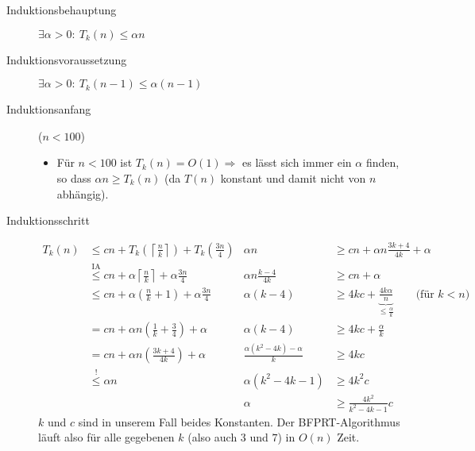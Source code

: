 \documentclass[a4paper,10pt]{scrartcl}
\begin{document}
\begin{description}
\item[Induktionsbehauptung] $\exists\alpha > 0{:}\ T_k(n) \leq \alpha n$
\item[Induktionsvoraussetzung] $\exists\alpha > 0{:}\ T_k(n-1) \leq \alpha (n-1)$
\item[Induktionsanfang] ($n < 100$)
    \begin{itemize}
     \item Für $n < 100$ ist $T_k(n) = O(1) \Rightarrow$ es lässt sich immer ein $\alpha$ finden, so dass $\alpha n \geq T_k(n)$ (da $T(n)$ konstant und damit nicht von $n$ abhängig).
    \end{itemize}
\item[Induktionsschritt]
\[
\begin{array}{rl|rl}
 T_k(n)   &\leq cn + T_k\left(\left\lceil\frac{n}{k}\right\rceil\right) + T_k\left(\frac{3n}{4}\right) &
                \alpha n &\geq cn + \alpha n \frac{3k + 4}{4k} + \alpha\\
        &\overset{\text{IA}}{\leq} cn + \alpha \left\lceil\frac{n}{k}\right\rceil + \alpha \frac{3n}{4} &
                \alpha n \frac{k - 4}{4k} &\geq cn + \alpha\\
        &\leq cn + \alpha \left(\frac{n}{k} + 1\right) + \alpha \frac{3n}{4} &
                \alpha (k - 4) &\geq 4kc + \underbrace{\frac{4k\alpha}{n}}_{\leq \frac{\alpha}{k}} \qquad \text{(für $k < n$)} \\
        &= cn + \alpha n \left(\frac{1}{k} + \frac{3}{4}\right) + \alpha  &
                \alpha (k - 4) &\geq 4kc + \frac{\alpha}{k}\\
        &= cn + \alpha n \left(\frac{3k + 4}{4k}\right) + \alpha &
                \frac{\alpha (k^2 - 4k) - \alpha}{k} &\geq 4kc\\
        &\overset{!}{\leq} \alpha n &
                \alpha (k^2 - 4k - 1) &\geq 4k^2c\\
        && \alpha &\geq \frac{4k^2}{k^2 - 4k - 1} c
\end{array}
\]
$k$ und $c$ sind in unserem Fall beides Konstanten. Der BFPRT-Algorithmus läuft also für alle gegebenen $k$ (also auch $3$ und $7$) in $O(n)$ Zeit.
\end{description}
\end{document}
